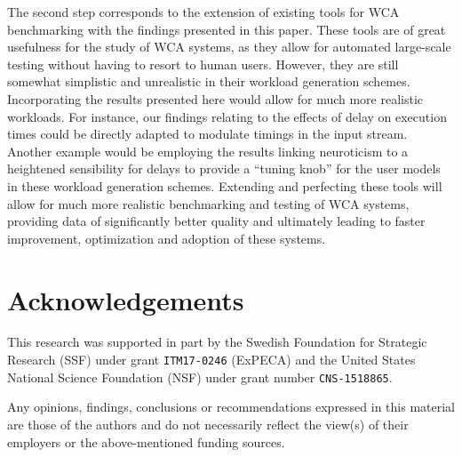 \documentclass[10pt,letterpaper]{article}
\newenvironment{acks}{
  \section*{Acknowledgements}
}{}
\begin{document}
The second step corresponds to the extension of existing tools for WCA benchmarking with the findings presented in this paper.
These tools are of great usefulness for the study of WCA systems, as they allow for automated large-scale testing without having to resort to human users.
However, they are still somewhat simplistic and unrealistic in their workload generation schemes.
Incorporating the results presented here would allow for much more realistic workloads.
For instance, our findings relating to the effects of delay on execution times could be directly adapted to modulate timings in the input stream.
Another example would be employing the results linking neuroticism to a heightened sensibility for delays to provide a ``tuning knob'' for the user models in these workload generation schemes.
Extending and perfecting these tools will allow for much more realistic benchmarking and testing of WCA systems, providing data of significantly better quality and ultimately leading to faster improvement, optimization and adoption of these systems.

\begin{acks}
  This research was supported in part by the Swedish Foundation for Strategic Research (SSF) under grant \texttt{ITM17-0246} (ExPECA) and the United States National Science Foundation (NSF) under grant number \texttt{CNS-1518865}.
  
  Any opinions, findings, conclusions or recommendations expressed in this material are those of the authors and do not necessarily reflect the view(s) of their employers or the above-mentioned funding sources.
\end{acks}

\nolinenumbers%

%
%
% 

\printbibliography%
\end{document}
